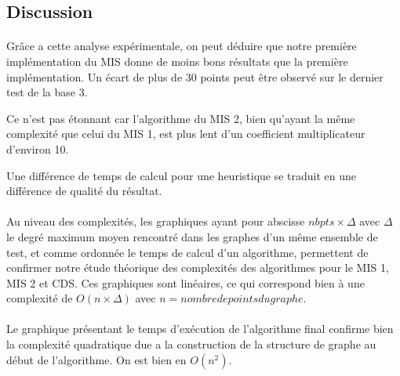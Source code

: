 \subsection{Discussion}

\paragraph{}
Grâce a cette analyse expérimentale, on peut déduire que notre première implémentation du MIS donne de moins bons résultats que la première implémentation. Un écart de plus de 30 points peut être observé sur le dernier test de la base 3.

Ce n'est pas étonnant car l'algorithme du MIS 2, bien qu'ayant la même complexité que celui du MIS 1, est plus lent d'un coefficient multiplicateur d'environ 10.

Une différence de temps de calcul pour une heuristique se traduit en une différence de qualité du résultat.

\paragraph{}
Au niveau des complexités, les graphiques ayant pour abscisse $nbpts \times \Delta$ avec $\Delta$ le degré maximum moyen rencontré dans les graphes d'un même ensemble de test, et comme ordonnée le temps de calcul d'un algorithme, permettent de confirmer notre étude théorique des complexités des algorithmes pour le MIS 1, MIS 2 et CDS.
Ces graphiques sont linéaires, ce qui correspond bien à une complexité de $O(n \times \Delta)$ avec $n = nombre de points du graphe$.

\paragraph{}
Le graphique présentant le temps d'exécution de l'algorithme final confirme bien la complexité quadratique due a la construction de la structure de graphe au début de l'algorithme. On est bien en $O(n^2)$.
